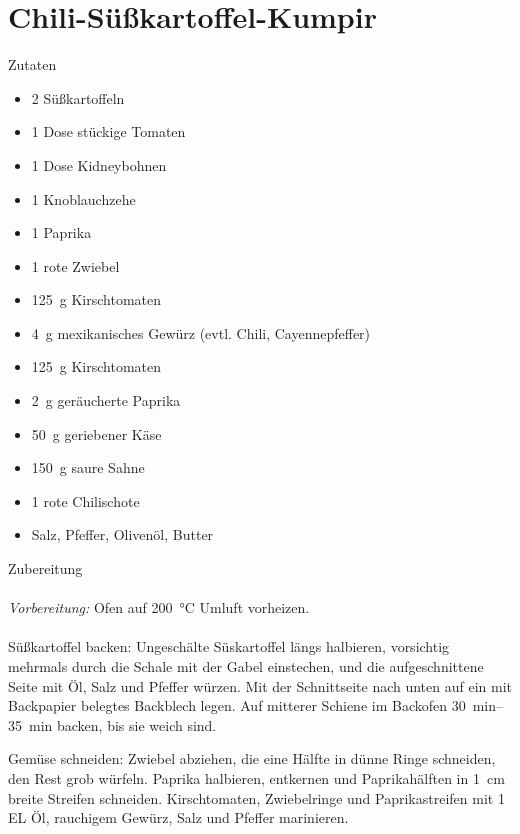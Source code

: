 \section*{Chili-Süßkartoffel-Kumpir}
\ihead{}\ohead{}
\cfoot{}
{\Large Zutaten}
\begin{multicols}{2}
\begin{itemize}
    \item \num{2} Süßkartoffeln
    \item \num{1} Dose stückige Tomaten 
    \item \num{1} Dose Kidneybohnen
    \item \num{1} Knoblauchzehe
    \item \num{1} Paprika
    \item \num{1} rote Zwiebel
    \item \SI{125}{g} Kirschtomaten
    \item \SI{4}{g} mexikanisches Gewürz (evtl. Chili, Cayennepfeffer)
    \item \SI{125}{g} Kirschtomaten
    \item \SI{2}{g} geräucherte Paprika
    \item \SI{50}{g} geriebener Käse
    \item \SI{150}{g} saure Sahne
    \item \num{1} rote Chilischote
    \item Salz, Pfeffer, Olivenöl, Butter
\end{itemize}
\end{multicols}
\noindent
{\Large Zubereitung}\\
\\
\textit{Vorbereitung:} Ofen auf \SI{200}{\celsius} Umluft vorheizen.\\\\
Süßkartoffel backen: Ungeschälte Süskartoffel längs halbieren, vorsichtig mehrmals durch die Schale mit der Gabel einstechen, und die aufgeschnittene Seite mit Öl, Salz und Pfeffer würzen.
Mit der Schnittseite nach unten auf ein mit Backpapier belegtes Backblech legen.
Auf mitterer Schiene im Backofen \SIrange{30}{35}{min} backen, bis sie weich sind. 

Gemüse schneiden: Zwiebel abziehen, die eine Hälfte in dünne Ringe schneiden, den Rest grob würfeln. 
Paprika halbieren, entkernen und Paprikahälften in \SI{1}{cm} breite Streifen schneiden. 
Kirschtomaten, Zwiebelringe und Paprikastreifen mit \num{1} EL Öl, rauchigem Gewürz, Salz und Pfeffer marinieren. 

